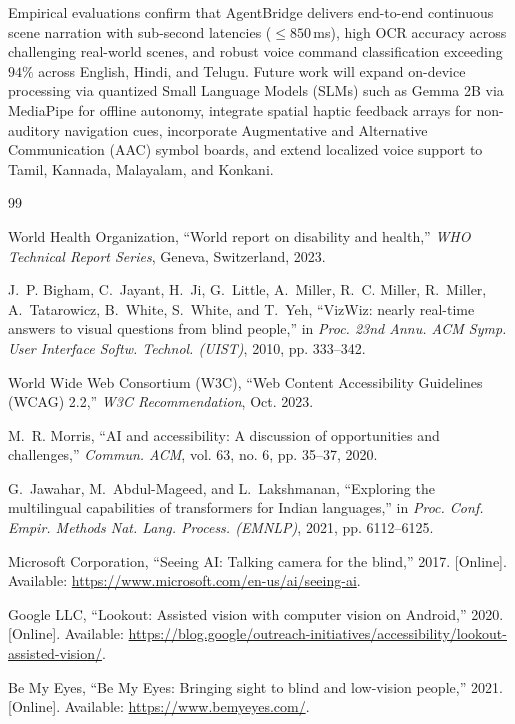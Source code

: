 \documentclass[10pt,a4paper]{article}
\begin{document}
Empirical evaluations confirm that AgentBridge delivers end-to-end continuous scene narration with sub-second latencies ($\le 850$\,ms), high OCR accuracy across challenging real-world scenes, and robust voice command classification exceeding $94\%$ across English, Hindi, and Telugu. Future work will expand on-device processing via quantized Small Language Models (SLMs) such as Gemma 2B via MediaPipe for offline autonomy, integrate spatial haptic feedback arrays for non-auditory navigation cues, incorporate Augmentative and Alternative Communication (AAC) symbol boards, and extend localized voice support to Tamil, Kannada, Malayalam, and Konkani.

\begin{thebibliography}{99}

World Health Organization, ``World report on disability and health,'' \textit{WHO Technical Report Series}, Geneva, Switzerland, 2023.

J.~P. Bigham, C.~Jayant, H.~Ji, G.~Little, A.~Miller, R.~C. Miller, R.~Miller, A.~Tatarowicz, B.~White, S.~White, and T.~Yeh, ``VizWiz: nearly real-time answers to visual questions from blind people,'' in \textit{Proc. 23nd Annu. ACM Symp. User Interface Softw. Technol. (UIST)}, 2010, pp. 333--342.

World Wide Web Consortium (W3C), ``Web Content Accessibility Guidelines (WCAG) 2.2,'' \textit{W3C Recommendation}, Oct. 2023.

M.~R. Morris, ``AI and accessibility: A discussion of opportunities and challenges,'' \textit{Commun. ACM}, vol. 63, no. 6, pp. 35--37, 2020.

G.~Jawahar, M.~Abdul-Mageed, and L.~Lakshmanan, ``Exploring the multilingual capabilities of transformers for Indian languages,'' in \textit{Proc. Conf. Empir. Methods Nat. Lang. Process. (EMNLP)}, 2021, pp. 6112--6125.

Microsoft Corporation, ``Seeing AI: Talking camera for the blind,'' 2017. [Online]. Available: \url{https://www.microsoft.com/en-us/ai/seeing-ai}.

Google LLC, ``Lookout: Assisted vision with computer vision on Android,'' 2020. [Online]. Available: \url{https://blog.google/outreach-initiatives/accessibility/lookout-assisted-vision/}.

Be My Eyes, ``Be My Eyes: Bringing sight to blind and low-vision people,'' 2021. [Online]. Available: \url{https://www.bemyeyes.com/}.


\end{thebibliography}
\end{document}
